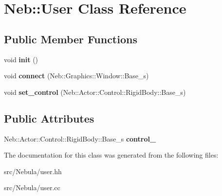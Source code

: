 \hypertarget{classNeb_1_1User}{\section{Neb\-:\-:User Class Reference}
\label{classNeb_1_1User}
}
\subsection*{Public Member Functions}
\begin{DoxyCompactItemize}
\item 
\hypertarget{classNeb_1_1User_a47530379dc6aa77e4a4097d19b3347de}{void {\bfseries init} ()}\label{classNeb_1_1User_a47530379dc6aa77e4a4097d19b3347de}

\item 
\hypertarget{classNeb_1_1User_a5e637a014414b530dde0c90f0122b305}{void {\bfseries connect} (Neb\-::\-Graphics\-::\-Window\-::\-Base\-\_\-s)}\label{classNeb_1_1User_a5e637a014414b530dde0c90f0122b305}

\item 
\hypertarget{classNeb_1_1User_ad193a4a8bdd4e1df8b7342b0838e7b52}{void {\bfseries set\-\_\-control} (Neb\-::\-Actor\-::\-Control\-::\-Rigid\-Body\-::\-Base\-\_\-s)}\label{classNeb_1_1User_ad193a4a8bdd4e1df8b7342b0838e7b52}

\end{DoxyCompactItemize}
\subsection*{Public Attributes}
\begin{DoxyCompactItemize}
\item 
\hypertarget{classNeb_1_1User_ad31a255b7b1a0107c94512db44fe63d5}{Neb\-::\-Actor\-::\-Control\-::\-Rigid\-Body\-::\-Base\-\_\-s {\bfseries control\-\_\-}}\label{classNeb_1_1User_ad31a255b7b1a0107c94512db44fe63d5}

\end{DoxyCompactItemize}


The documentation for this class was generated from the following files\-:\begin{DoxyCompactItemize}
\item 
src/\-Nebula/user.\-hh\item 
src/\-Nebula/user.\-cc\end{DoxyCompactItemize}
